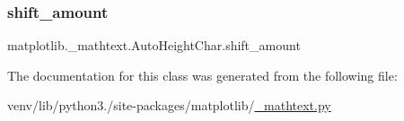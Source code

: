 \subsubsection{\texorpdfstring{shift\+\_\+amount}{shift\_amount}}
{\footnotesize\ttfamily matplotlib.\+\_\+mathtext.\+Auto\+Height\+Char.\+shift\+\_\+amount}



The documentation for this class was generated from the following file\+:\begin{DoxyCompactItemize}
\item 
venv/lib/python3./site-\/packages/matplotlib/\hyperlink{__mathtext_8py}{\+\_\+mathtext.\+py}\end{DoxyCompactItemize}
